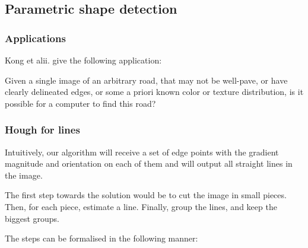 \subsection{Parametric shape detection}

\subsubsection{Applications}
 
 Kong et alii. give the following application:
 
 Given a single image of an arbitrary road, that may not be well-pave, or have clearly delineated edges, or some a priori known color or texture distribution, is it possible for a computer to find this road?
 
\subsubsection{Hough for lines}

Intuitively, our algorithm will receive a set of edge points with the gradient magnitude and orientation on each of them and will output all straight lines in the image.

The first step towards the solution would be to cut the image in small pieces. Then, for each piece, estimate a line. Finally, group the lines, and keep the biggest groups.

The steps can be formalised in the following manner:

